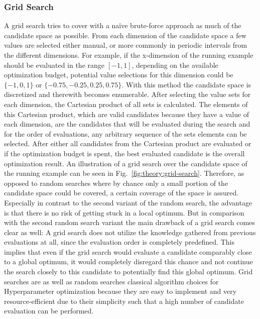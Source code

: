 \subsubsection{Grid Search}
\label{sec:theory:optimization:search:grid}
A grid search tries to cover with a na\"ive brute-force approach as much of the candidate space as possible.
From each dimension of the candidate space a few values are selected either manual, or more commonly in periodic intervals from the different dimensions.
For example, if the x-dimension of the running example should be evaluated in the range $[-1,1]$, depending on the available optimization budget, potential value selections for this dimension could be $\{-1,0,1\}$ or $\{-0.75,-0.25,0.25,0.75\}$.
With this method the candidate space is discretized and therewith becomes enumerable.\newline
After selecting the value sets for each dimension, the Cartesian product of all sets is calculated.
The elements of this Cartesian product, which are valid candidates because they have a value of each dimension, are the candidates that will be evaluated during the search and for the order of evaluations, any arbitrary sequence of the sets elements can be selected.
After either all candidates from the Cartesian product are evaluated or if the optimization budget is spent, the best evaluated candidate is the overall optimization result.
An illustration of a grid search over the candidate space of the running example can be seen in Fig.~\ref{fig:theory:grid-search}.\newline
Therefore, as opposed to random searches where by chance only a small portion of the candidate space could be covered, a certain coverage of the space is assured.
Especially in contrast to the second variant of the random search, the advantage is that there is no risk of getting stuck in a local optimum.
But in comparison with the second random search variant the main drawback of a grid search comes clear as well: A grid search does not utilize the knowledge gathered from previous evaluations at all, since the evaluation order is completely predefined.
This implies that even if the grid search would evaluate a candidate comparably close to a global optimum, it would completely disregard this chance and not continue the search closely to this candidate to potentially find this global optimum.\newline
Grid searches are as well as random searches classical algorithm choices for Hyperparameter optimization because they are easy to implement and very resource-efficient due to their simplicity such that a high number of candidate evaluation can be performed.
